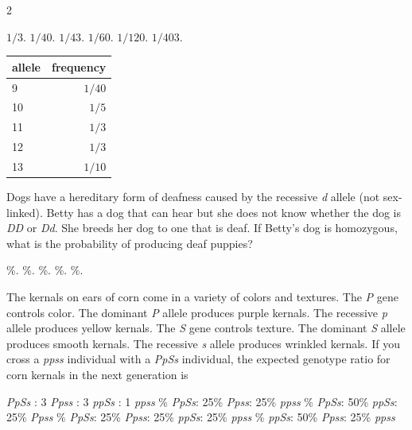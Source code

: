 \begin{multicols}{2}
\begin{choices}
\choice $1/3$.%
\choice $1/40$.%
\choice $1/43$.%
\correctchoice $1/60$.%
\choice $1/120$.%
\choice $1/403$.%
\end{choices}
\columnbreak
\begin{tabular}{lr}
\toprule
allele & frequency\\
\midrule
9 & $1/40$\\
10 & $1/5$\\
11 & $1/3$\\
12 & $1/3$\\
13 & $1/10$\\
\bottomrule
\end{tabular}
\end{multicols}

\question
Dogs have a hereditary form of deafness caused by the recessive \textit{d} allele (not sex-linked).  Betty has a dog that can hear but she does not know whether the dog is \textit{DD} or \textit{Dd}.  She breeds her dog to one that is deaf.  If Betty's dog is homozygous, what is the probability of producing deaf puppies?

\begin{choices}
\%.%
\%.%
\%.%
\%.%
\%.%
\end{choices}


\question
The kernals on ears of corn come in a variety of colors and textures. The \textit{P} gene controls color.  The dominant \textit{P} allele produces purple kernals. The recessive \textit{p} allele produces yellow kernals.  The \textit{S} gene controls texture. The dominant \textit{S} allele produces smooth kernals. The recessive \textit{s} allele produces wrinkled kernals. If you cross a \textit{ppss} individual with a \textit{PpSs} individual, the expected genotype ratio for corn kernals in the next generation is 

\begin{choices}
 \textit{PpSs} : 3 \textit{Ppss} : 3 \textit{ppSs} : 1 \textit{ppss}%
\% \textit{PpSs}: 25\% \textit{Ppss}: 25\% \textit{ppss}%
\% \textit{PpSs}: 50\% \textit{ppSs}: 25\% \textit{Ppss}%
\% \textit{PpSs}: 25\% \textit{Ppss}: 25\% \textit{ppSs}: 25\% \textit{ppss}%
\% \textit{ppSs}: 50\% \textit{Ppss}: 25\% \textit{ppss}%
\end{choices}


